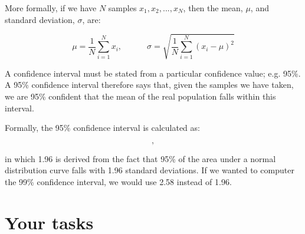 \documentclass{article}
\begin{document}
More formally, if we have $N$ samples $x_1, x_2, ..., x_N$, then the mean, $\mu$, and standard deviation, $\sigma$, are:


\begin{displaymath}
\mu = \frac{1}{N} \sum_{i=1}^{N}x_i,
 \hspace{3em} 
\sigma = \sqrt{\frac{1}{N}\sum_{i=1}^{N}(x_i - \mu)^2}
\end{displaymath}

A confidence interval must be stated from a particular confidence value; e.g. 95\%. A 95\% confidence interval therefore says that, given the samples we have taken, we are 95\% confident that the mean of the real population falls within this interval.

Formally, the 95\% confidence interval is calculated as:

\begin{displaymath}
  [\mu - 1.96\frac{\sigma}{\sqrt{N}},~~ \mu + 1.96\frac{\sigma}{\sqrt{N}} ],
\end{displaymath}

\noindent 
in which 1.96 is derived from the fact that 95\% of the area under a normal distribution curve falls with 1.96 standard deviations. If we wanted to computer the 99\% confidence interval, we would use 2.58 instead of 1.96.

\section*{Your tasks}
\end{document}
